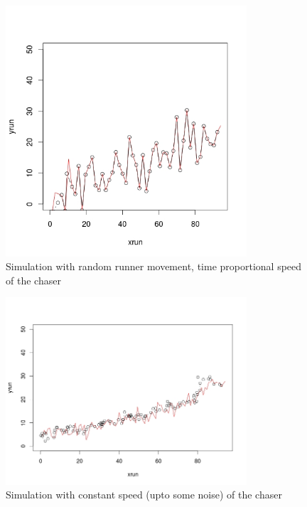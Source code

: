 \documentclass[a4paper,11pt]{article}
\begin{document}
\begin{figure}[H]
\centering
\includegraphics[width=0.8\textwidth]{sim50points.jpeg}
\caption{Simulation with random runner movement, time proportional speed of the chaser}
\end{figure}

\begin{figure}[H]
\centering
\includegraphics[width=0.8\textwidth]{sim100points_randomizedtraj.jpeg}
\caption{Simulation with constant speed (upto some noise) of the chaser}
\end{figure}
\end{document}
